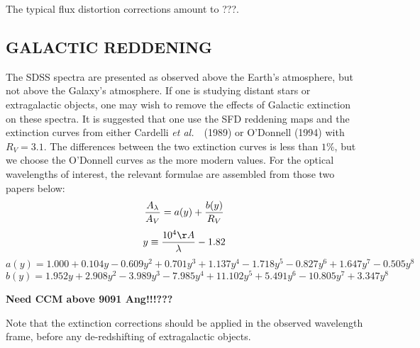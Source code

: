 \documentclass[12pt,preprint]{aastex}
\newcommand{\etal}{{\it et al.}~}
\begin{document}
The typical flux distortion corrections amount to ???.

\subsection{GALACTIC REDDENING}

The SDSS spectra are presented as observed above the Earth's
atmosphere, but not above the Galaxy's atmosphere.
If one is studying distant stars or extragalactic objects,
one may wish to remove the effects of Galactic extinction
on these spectra.  It is suggested that one use the SFD reddening
maps and the extinction curves from either Cardelli \etal\ (1989)
or O'Donnell (1994) with $R_V=3.1$.  The differences between the
two extinction curves is less than $1\%$, but we choose the O'Donnell
curves as the more modern values.  For the optical wavelengths
of interest, the relevant formulae are
assembled from those two papers below:
$$ {A_\lambda \over A_V} = a(y) + {b(y)\over R_V} $$
$$ y \equiv {10^4\AA \over \lambda} - 1.82 $$
$$ a(y) = 1.000 + 0.104 y - 0.609 y^2 + 0.701 y^3 + 1.137 y^4
  - 1.718 y^5 - 0.827 y^6 + 1.647 y^7 - 0.505 y^8 $$
$$ b(y) = 1.952 y + 2.908 y^2 - 3.989 y^3 - 7.985 y^4
  + 11.102 y^5 + 5.491 y^6 - 10.805 y^7 + 3.347 y^8 $$

{\bf Need CCM above 9091 Ang!!!???}

Note that the extinction corrections should be applied in the
observed wavelength frame, before any de-redshifting of extragalactic objects.



\newpage



\end{document}
